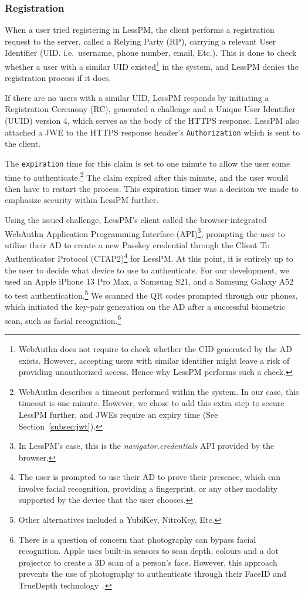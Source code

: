 \subsubsection{Registration}\label{subsubsec:metho-registration}
When a user tried registering in LessPM, the client performs a
registration request to the server, called a Relying Party (RP), carrying a
relevant User Identifier (UID. i.e.\ username, phone number, email, Etc.).
This is done to check whether a user with a similar UID existed\footnote{
  WebAuthn does not require to check whether the CID generated by the AD exists.
  However, accepting users with similar identifier might leave a risk of
  providing unauthorized access.
  Hence why LessPM performs such a check.
} in the system, and LessPM denies the registration process if it does.

If there are no users with a similar UID, LessPM responds by initiating a
Registration Ceremony (RC), generated a challenge and a Unique User
Identifier (UUID) version 4, which serves as the body of the HTTPS response.
LessPM also attached a JWE to the HTTPS response header's
\texttt{Authorization} which is sent to the client.

The \texttt{expiration} time for this claim is set to one minute to allow the
user some time to authenticate.\footnote{
  WebAuthn describes a timeout performed within the system. In our case, this
  timeout is one minute.
  However, we chose to add this extra step to secure LessPM further, and
  JWEs require an expiry time (See Section~\ref{subsec:jwt}).
}
The claim expired after this minute, and the user would then have to restart the
process.
This expiration timer was a decision we made to emphasize security within LessPM
further.

Using the issued challenge, LessPM's client called the browser-integrated
WebAuthn Application Programming Interface (API)\footnote{
  In LessPM's case, this is the \textit{navigator.credentials} API provided by
  the browser.
},
prompting the user to utilize their AD to create a new Passkey credential
through the Client To Authenticator Protocol (CTAP2)\footnote{
  The user is prompted to use their AD to prove their presence, which can
  involve facial recognition, providing a fingerprint, or any other modality
  supported by the device that the user chooses.
} for
LessPM\@.
At this point, it is entirely up to the user to decide what device to use to
authenticate.
For our development, we used an Apple iPhone 13 Pro Max, a Samsung S21, and a
Samsung Galaxy A52 to test authentication.\footnote{
  Other alternatives included a YubiKey, NitroKey, Etc.
}
We scanned the QR codes prompted through our phones, which initiated the
key-pair generation on the AD after a successful biometric scan, such as
facial recognition.\footnote{
  There is a question of concern that photography can bypass facial recognition.
  Apple uses built-in sensors to scan depth, colours and a dot projector to
  create a 3D scan of a person's face.
  However, this approach prevents the use of photography to authenticate through
  their FaceID and TrueDepth technology~\cite{apple-support}.
}

